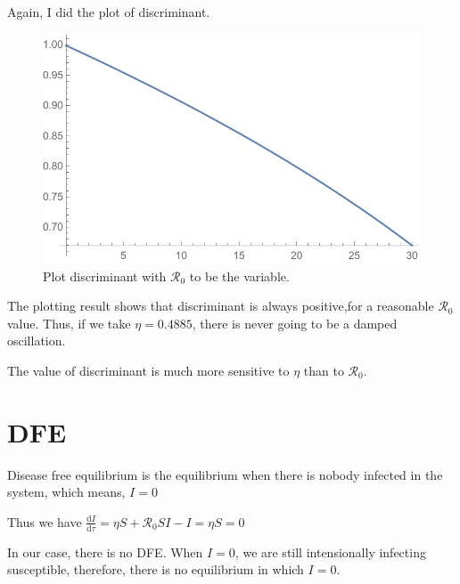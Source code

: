 \documentclass[12pt]{article}
\begin{document}
Again, I did the plot of discriminant.

\begin{figure}
  \caption{Plot discriminant with $\mathcal{R}_0$ to be the variable.}
  \includegraphics[width=1\textwidth]{Figures/Plot_R_S.pdf}
\end{figure}

The plotting result shows that discriminant is always positive,for a reasonable $\mathcal{R}_0$ value. Thus, if we take $\eta=0.4885$, there is never going to be a damped oscillation.

The value of discriminant is much more sensitive to $\eta$ than to $\mathcal{R}_0$.

\section{DFE}

Disease free equilibrium is the equilibrium when there is nobody infected in the system, which means, $I=0$

Thus we have $\frac{\mathrm{d}I}{\mathrm{d}\tau}=\eta S+\mathcal{R}_0 SI-I=\eta S=0$

In our case, there is no DFE. When $I=0$, we are still intensionally infecting susceptible,  therefore, there is no equilibrium in which $I=0$.
\end{document}
